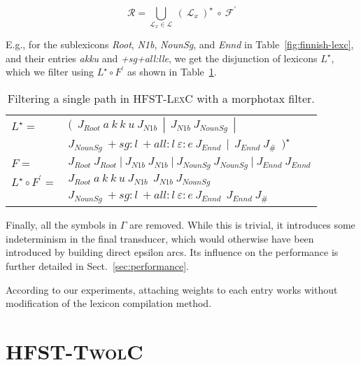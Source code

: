 \documentclass[a4paper]{article}
\begin{document}
\begin{equation}
  \label{eqn5}
  \mathcal{R} = \bigcup_{\mathcal{L}_{x} \in \mathcal{L}}~(~\mathcal{L}_{x}~)^{\star}~\circ~\mathcal{F}^{\prime}
\end{equation}

E.g., for the sublexicons \emph{Root}, \emph{N1b}, \emph{NounSg}, and
\emph{Ennd} in Table~\ref{fig:finnish-lexc}, and their entries
\emph{akku} and \emph{+sg+all:lle}, we get the disjunction of lexicons
$L^{\star}$, which we filter using $L^{\star} \circ F^{\prime}$ as
shown in Table~\ref{filter-example}.

\begin{table}[!h]
  \center
  \begin{small}
    \begin{tabular}{l l}
      $L^{\star} =$ & $(~~J_{Root}~a~k~k~u~J_{N1b}~~|~~J_{N1b}~J_{NounSg}~~|$ \\
                    & $J_{NounSg}~\!+\!sg\!:\!l~\!+all\!:\!l~\varepsilon\!:\!e~J_{Ennd}~~|~~J_{Ennd}~J_{\#}~~)^{\star}$\\

      $F =$         & $J_{Root}~J_{Root}~|~J_{N1b}~J_{N1b}~|~J_{NounSg}~J_{NounSg}~|~J_{Ennd}~J_{Ennd}$ \\

      $L^{\star} \circ F^{\prime} =$ & $J_{Root}~a~k~k~u~J_{N1b}~~J_{N1b}~J_{NounSg}$ \\
                          & $J_{NounSg}~\!+\!sg\!:\!l~\!+\!all\!:\!l~\varepsilon\!:\!e~J_{Ennd}~~J_{Ennd}~J_{\#}$\\

    \end{tabular}
  \end{small}
  \caption{Filtering a single path in \textsc{HFST-LexC} with a
  morphotax filter.}  \label{filter-example}
\end{table}

Finally, all the symbols in $\Gamma$ are removed. While this is
trivial, it introduces some indeterminism in the final transducer,
which would otherwise have been introduced by building direct epsilon
arcs. Its influence on the performance is further detailed in
Sect.~\ref{sec:performance}.

According to our experiments, attaching weights to each entry works
without modification of the lexicon compilation method.

\section{\textsc{HFST-TwolC}}
\end{document}
